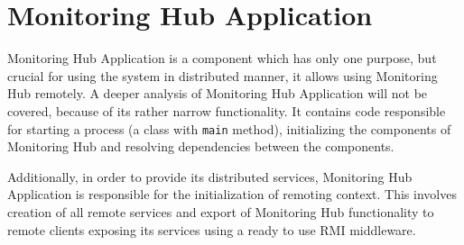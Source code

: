 %
\section{Monitoring Hub Application}
\label{sec:arch_monitoring_hub_application}

Monitoring Hub Application is a component which has only one purpose, but crucial for using the system in distributed manner,  it allows using Monitoring Hub remotely. A deeper analysis of Monitoring Hub Application will not be covered, because of its rather narrow functionality. It contains code responsible for starting a process (a class with \texttt{main} method), initializing the components of Monitoring Hub and resolving dependencies between the components.

Additionally, in order to provide its distributed services, Monitoring Hub Application is responsible for the initialization of remoting context. This involves creation of all remote services and export of Monitoring Hub functionality to remote clients exposing its services using a ready to use RMI middleware.

